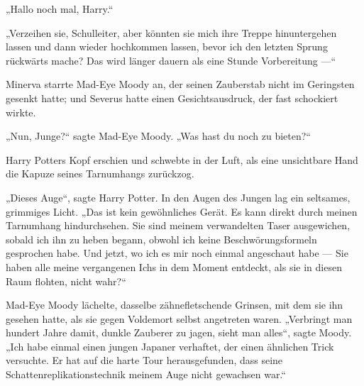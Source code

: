 \later

„Hallo noch mal, Harry.“

„Verzeihen sie, Schulleiter, aber könnten sie mich ihre Treppe hinuntergehen lassen und dann wieder hochkommen lassen, bevor ich den letzten Sprung rückwärts mache? Das wird länger dauern als eine Stunde Vorbereitung —“

\later

Minerva starrte Mad-Eye Moody an, der seinen Zauberstab nicht im Geringsten gesenkt hatte; und Severus hatte einen Gesichtsausdruck, der fast schockiert wirkte.

„Nun, Junge?“ sagte Mad-Eye Moody.
„Was hast du noch zu bieten?“

Harry Potters Kopf erschien und schwebte in der Luft, als eine unsichtbare Hand die Kapuze seines Tarnumhangs zurückzog.

„Dieses Auge“, sagte Harry Potter. In den Augen des Jungen lag ein seltsames, grimmiges Licht.
„Das ist kein gewöhnliches Gerät. Es kann direkt durch meinen Tarnumhang hindurchsehen. Sie sind meinem verwandelten Taser ausgewichen, sobald ich ihn zu heben begann, obwohl ich keine Beschwörungsformeln gesprochen habe. Und jetzt, wo ich es mir noch einmal angeschaut habe — Sie haben alle meine vergangenen Ichs in dem Moment entdeckt, als sie in diesen Raum flohten, nicht wahr?“

Mad-Eye Moody lächelte, dasselbe zähnefletschende Grinsen, mit dem sie ihn gesehen hatte, als sie gegen Voldemort selbst angetreten waren.
„Verbringt man hundert Jahre damit, dunkle Zauberer zu jagen, sieht man alles“, sagte Moody.
„Ich habe einmal einen jungen Japaner verhaftet, der einen ähnlichen Trick versuchte. Er hat auf die harte Tour herausgefunden, dass seine Schattenreplikationstechnik meinem Auge nicht gewachsen war.“

